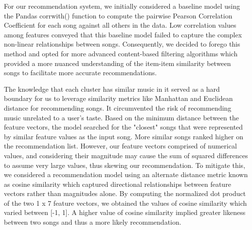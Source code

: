 \documentclass{article}
\begin{document}

For our recommendation system, we initially considered a baseline model using the Pandas corrwith() function to compute the pairwise Pearson Correlation Coefficient for each song against all others in the data. Low correlation values among features conveyed that this baseline model failed to capture the complex non-linear relationships between songs. Consequently, we decided to forego this method and opted for more advanced content-based filtering algorithms which provided a more nuanced understanding of the item-item similarity between songs to facilitate more accurate recommendations.

The knowledge that each cluster has similar music in it served as a hard boundary for us to leverage similarity metrics like Manhattan and Euclidean distance for recommending songs. It circumvented the risk of recommending music unrelated to a user’s taste. Based on the minimum distance between the feature vectors, the model searched for the "closest" songs that were represented by similar feature values as the input song. More similar songs ranked higher on the recommendation list. However, our feature vectors comprised of numerical values, and considering their magnitude may cause the sum of squared differences to assume very large values, thus skewing our recommendation. To mitigate this, we considered a recommendation model using an alternate distance metric known as cosine similarity which captured directional relationships between feature vectors rather than magnitudes alone. By computing the normalized dot product of the two 1 x 7 feature vectors, we obtained the values of cosine similarity which varied between [-1, 1]. A higher value of cosine similarity implied greater likeness between two songs and thus a more likely recommendation.

\end{document}

